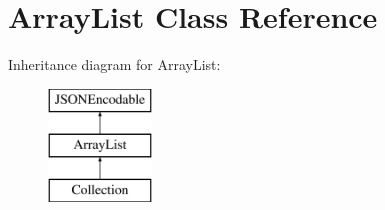 \hypertarget{classArrayList}{
\section{ArrayList Class Reference}
\label{classArrayList}
}
Inheritance diagram for ArrayList:\begin{figure}[H]
\begin{center}
\leavevmode
\includegraphics[height=3.000000cm]{classArrayList}
\end{center}
\end{figure}

